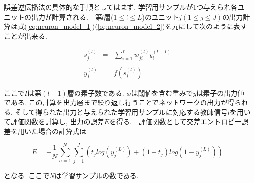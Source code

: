 誤差逆伝播法の具体的な手順としてはまず, 学習用サンプルが1つ与えられ各ユニットの出力が計算される.　第$l$層($1 \leq l \leq L $)のユニット$j (1 \leq j \leq J)$の出力計算は式(\ref{eq:neuron_model_1})(\ref{eq:neuron_model_2})を元にして次のように表すことが出来る.

\begin{eqnarray}
　　\displaystyle s_{j}^{(l)} &=& \sum_{i=1}^{I}w_{ji}^{(l)}y_{i}^{(l-1)}\\
　　\nonumber \\
　　y_{j}^{(l)} &=& f(s_{j}^{(l)})
　　\label{eq:bp_1}
\end{eqnarray}

\noindent
ここで$I$は第$(l-1)$層の素子数である. $w$は閾値を含む重みで$y$は素子の出力値である. この計算を出力層まで繰り返し行うことでネットワークの出力が得られる. そして得られた出力と与えられた学習用サンプルに対応する教師信号$t$を用いて評価関数を計算し, 出力の誤差$E$を得る.　評価関数として交差エントロピー誤差を用いた場合の計算式は

\begin{equation}
\displaystyle E = -\frac{1}{N}\sum_{n=1}^{N}\sum_{j=1}^{J}\left(t_{j}log(y_{j}^{(L)}) + (1 - t_{j})log(1 - y_{j}^{(L)})\right)
\end{equation}

\noindent
となる. ここで$N$は学習サンプルの数である.






























